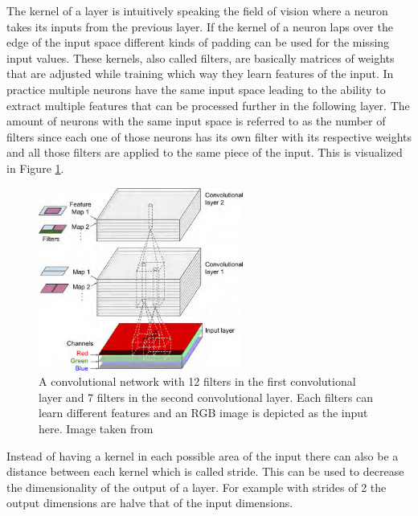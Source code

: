 The kernel of a layer is intuitively speaking the field of vision where a neuron takes its inputs from
the previous layer. If the kernel of a neuron laps over the edge
of the input space different kinds of padding can be used for the missing input values.
These kernels, also called filters, are basically matrices of weights that are
adjusted while training which way they learn features of the input. In practice multiple neurons have
the same input space leading to the ability to extract multiple features that can be processed
further in the following layer. The amount of neurons with the same input space is referred to as
the number of filters since each one of those neurons has its own filter with its respective
weights and all those filters are applied to the same piece of the input. This is visualized in
Figure \ref{figure_cnn_filter}.

\begin{figure}[h]
    \centering
    \includegraphics[width=0.6\textwidth]{images/figures/convolutional_net_multiple_filters.png}
    \caption{A convolutional network with 12 filters in the first convolutional layer and 7
    filters in the second convolutional layer. Each filters can learn different features and an
    RGB image is depicted as the input here.
    Image taken from \parencite{2017-geron-homl}} \label{figure_cnn_filter}
\end{figure}

Instead of having a kernel in each possible area of the input there can also be a distance between
each kernel which is called stride. This can be used to decrease the dimensionality of the output
of a layer. For example with strides of 2 the output dimensions are halve that of the input
dimensions.

